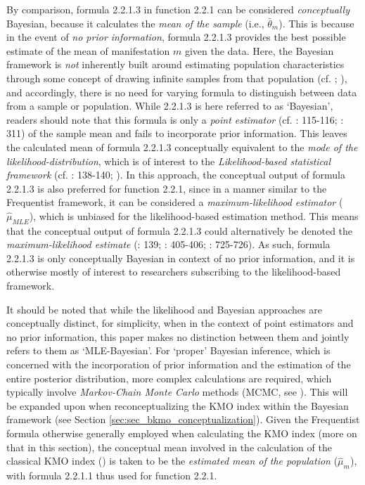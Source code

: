 \documentclass[
  10pt,
  a4paper,
  twoside]{article}
\begin{document}
By comparison, formula 2.2.1.3 in function 2.2.1 can be considered \emph{conceptually} Bayesian, because it calculates the \emph{mean of the sample} (i.e., \(\bar{\theta}_m\)). This is because in the event of \emph{no prior information}, formula 2.2.1.3 provides the best possible estimate of the mean of manifestation \(m\) given the data. Here, the Bayesian framework is \emph{not} inherently built around estimating population characteristics through some concept of drawing infinite samples from that population (cf. ; ), and accordingly, there is no need for varying formula to distinguish between data from a sample or population. While 2.2.1.3 is here referred to as `Bayesian', readers should note that this formula is only a \emph{point estimator} (cf. : 115-116; : 311) of the sample mean and fails to incorporate prior information. This leaves the calculated mean of formula 2.2.1.3 conceptually equivalent to the \emph{mode of the likelihood-distribution}, which is of interest to the \emph{Likelihood-based statistical framework} (cf. : 138-140; ). In this approach, the conceptual output of formula 2.2.1.3 is also preferred for function 2.2.1, since in a manner similar to the Frequentist framework, it can be considered a \emph{maximum-likelihood estimator} (\(\hat{\mu}_{MLE}\)), which is unbiased for the likelihood-based estimation method. This means that the conceptual output of formula 2.2.1.3 could alternatively be denoted the \emph{maximum-likelihood estimate} (: 139; : 405-406; : 725-726). As such, formula 2.2.1.3 is only conceptually Bayesian in context of no prior information, and it is otherwise mostly of interest to researchers subscribing to the likelihood-based framework.

It should be noted that while the likelihood and Bayesian approaches are conceptually distinct, for simplicity, when in the context of point estimators and no prior information, this paper makes no distinction between them and jointly refers to them as `MLE-Bayesian'. For `proper' Bayesian inference, which is concerned with the incorporation of prior information and the estimation of the entire posterior distribution, more complex calculations are required, which typically involve \emph{Markov-Chain Monte Carlo} methods (MCMC, see ). This will be expanded upon when reconceptualizing the KMO index within the Bayesian framework (see Section \ref{sec:sec_bkmo_conceptualization}). Given the Frequentist formula otherwise generally employed when calculating the KMO index (more on that in this section), the conceptual mean involved in the calculation of the classical KMO index () is taken to be the \emph{estimated mean of the population} (\(\hat{\mu}_m\)), with formula 2.2.1.1 thus used for function 2.2.1.
\end{document}
